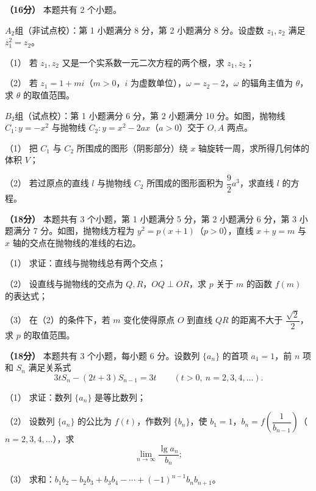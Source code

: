 \Needspace{0.4\textheight}
\begin{question}
\textbf{（16分）} 本题共有 2 个小题。

$A_2$组（非试点校）：第 1 小题满分 8 分，第 2 小题满分 8 分。设虚数 $z_1,z_2$ 满足 $z_1^2=z_2$。

（1） 若 $z_1,z_2$ 又是一个实系数一元二次方程的两个根，求 $z_1,z_2$；

（2） 若 $z_1=1+mi$（$m>0$，$i$ 为虚数单位），$\omega=z_2-2$，$\omega$ 的辐角主值为 $\theta$，求 $\theta$ 的取值范围。

$B_2$组（试点校）：第 1 小题满分 6 分，第 2 小题满分 10 分。如图，抛物线 $C_1:y=-x^2$ 与抛物线 $C_2:y=x^2-2ax$（$a>0$）交于 $O,A$ 两点。

（1） 把 $C_1$ 与 $C_2$ 所围成的图形（阴影部分）绕 $x$ 轴旋转一周，求所得几何体的体积 $V$；

（2） 若过原点的直线 $l$ 与抛物线 $C_2$ 所围成的图形面积为 $\dfrac92a^3$，求直线 $l$ 的方程。
\nopagebreak[4]
\begin{center}\end{center}
\nopagebreak[4]
\Needspace{0.4\textheight}
\end{question}
\begin{question}
\textbf{（18分）} 本题共有 3 个小题，第 1 小题满分 5 分，第 2 小题满分 6 分，第 3 小题满分 7 分。如图，抛物线方程为 $y^2=p(x+1)$（$p>0$），直线 $x+y=m$ 与 $x$ 轴的交点在抛物线的准线的右边。

（1） 求证：直线与抛物线总有两个交点；

（2） 设直线与抛物线的交点为 $Q,R$，$OQ\perp OR$，求 $p$ 关于 $m$ 的函数 $f(m)$ 的表达式；

（3） 在（2）的条件下，若 $m$ 变化使得原点 $O$ 到直线 $QR$ 的距离不大于 $\dfrac{\sqrt2}{2}$，求 $p$ 的取值范围。
\nopagebreak[4]
\begin{center}\end{center}
\nopagebreak[4]
\end{question}
\begin{question}
\textbf{（18分）} 本题共有 3 个小题，每小题 6 分。设数列 $\{a_n\}$ 的首项 $a_1=1$，前 $n$ 项和 $S_n$ 满足关系式
\nopagebreak[4]
\[3tS_n-(2t+3)S_{n-1}=3t\qquad(t>0,\ n=2,3,4,\ldots).\]

（1） 求证：数列 $\{a_n\}$ 是等比数列；

（2） 设数列 $\{a_n\}$ 的公比为 $f(t)$，作数列 $\{b_n\}$，使 $b_1=1$，$b_n=f\!\left(\dfrac1{b_{n-1}}\right)$（$n=2,3,4,\ldots$），求
\nopagebreak[4]
\[
\lim_{n\to\infty}\frac{\lg a_n}{b_n};
\]

（3） 求和：$b_1b_2-b_2b_3+b_3b_4-\cdots+(-1)^{n-1}b_nb_{n+1}$。

\end{question}